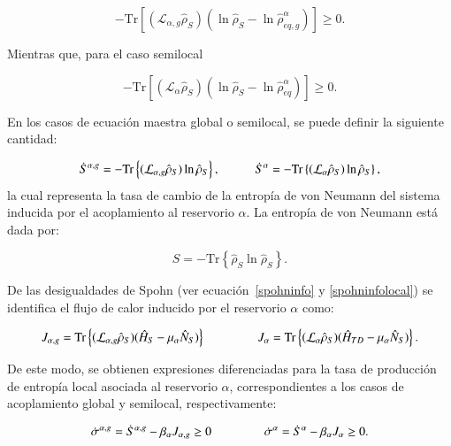 \begin{equation}
    - \text{Tr}[ (\mathcal{L}_{\alpha,g} \hat{\rho}_{S})(\ln \hat{\rho}_{S} - \ln \hat{\rho}^{\alpha}_{eq,g} )  ] \geq 0.
\label{spohninfo}
\end{equation}

Mientras que, para el caso semilocal

\begin{equation}
    - \text{Tr}[ (\mathcal{L}_{\alpha} \hat{\rho}_{S})(\ln \hat{\rho}_{S} - \ln \hat{\rho}^{\alpha}_{eq} )  ] \geq 0.
\label{spohninfolocal}
\end{equation}

En los casos de ecuación maestra global o semilocal, se puede definir la siguiente cantidad:

\begin{equation}
    \dot{S}^{\alpha,g} = - \mathrm{Tr} \left\{ (\mathcal{L}_{\alpha,g} \hat{\rho}_S) \ln \hat{\rho}_S \right\}, \hspace{10mm}
    \dot{S}^{\alpha} = - \mathrm{Tr} \left\{ (\mathcal{L}_{\alpha} \hat{\rho}_S) \ln \hat{\rho}_S \right\},
\end{equation}
la cual representa la tasa de cambio de la entropía de von Neumann del sistema inducida por el acoplamiento al reservorio $\alpha$. La entropía de von Neumann está dada por:

\begin{equation}
    S = - \mathrm{Tr} \left\{ \hat{\rho}_S \ln \hat{\rho}_S \right\}.
\end{equation}

De las desigualdades de Spohn (ver ecuación~\ref{spohninfo} y \ref{spohninfolocal}) se identifica el flujo de calor inducido por el reservorio $\alpha$ como:

\begin{equation*}
    J_{\alpha,g} =  \mathrm{Tr} \left\{ (\mathcal{L}_{\alpha,g} \hat{\rho}_S) (\hat{H}_{S}-\mu_{\alpha}\hat{N}_{S}) \right\} \hspace{15mm}
    J_{\alpha} = \mathrm{Tr} \left\{ (\mathcal{L}_{\alpha} \hat{\rho}_S) (\hat{H}_{TD}-\mu_{\alpha}\hat{N}_{S}) \right\}. 
\end{equation*}

De este modo, se obtienen expresiones diferenciadas para la tasa de producción de entropía local asociada al reservorio $\alpha$, correspondientes a los casos de acoplamiento global y semilocal, respectivamente:

\begin{equation}
    \dot{\sigma}^{\alpha,g} = \dot{S}^{\alpha,g} - \beta_{\alpha} J_{\alpha,g} \geq 0 \hspace{15mm}
    \dot{\sigma}^{\alpha} = \dot{S}^{\alpha} - \beta_{\alpha} J_{\alpha} \geq 0. 
    \label{sec4:localentropy}
\end{equation}

